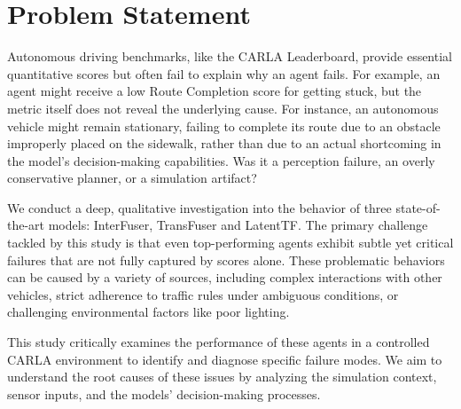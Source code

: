 \section{Problem Statement}
\label{sec:problem}

Autonomous driving benchmarks, like the CARLA Leaderboard, provide essential quantitative scores but often fail to explain why an agent fails. For example, an agent might receive a low Route Completion score for getting stuck, but the metric itself does not reveal the underlying cause. For instance, an autonomous vehicle might remain stationary, failing to complete its route due to an obstacle improperly placed on the sidewalk, rather than due to an actual shortcoming in the model's decision-making capabilities. Was it a perception failure, an overly conservative planner, or a simulation artifact?

We conduct a deep, qualitative investigation into the behavior of three state-of-the-art models: InterFuser, TransFuser and LatentTF. The primary challenge tackled by this study is that even top-performing agents exhibit subtle yet critical failures that are not fully captured by scores alone. These problematic behaviors can be caused by a variety of sources, including complex interactions with other vehicles, strict adherence to traffic rules under ambiguous conditions, or challenging environmental factors like poor lighting.

This study critically examines the performance of these agents in a controlled CARLA environment to identify and diagnose specific failure modes. We aim to understand the root causes of these issues by analyzing the simulation context, sensor inputs, and the models' decision-making processes.